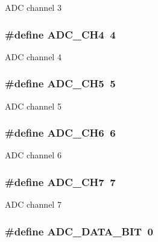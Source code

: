 A\-D\-C channel 3 \hypertarget{group__ex4__adc_ga3648bb19b5c3735452fee16c835afc43}{
\subsubsection[{A\-D\-C\-\_\-\-C\-H4}]{\setlength{\rightskip}{0pt plus 5cm}\#define A\-D\-C\-\_\-\-C\-H4~4}}\label{group__ex4__adc_ga3648bb19b5c3735452fee16c835afc43}
A\-D\-C channel 4 \hypertarget{group__ex4__adc_ga479d965dae60f80b698f0dd6a348e30a}{
\subsubsection[{A\-D\-C\-\_\-\-C\-H5}]{\setlength{\rightskip}{0pt plus 5cm}\#define A\-D\-C\-\_\-\-C\-H5~5}}\label{group__ex4__adc_ga479d965dae60f80b698f0dd6a348e30a}
A\-D\-C channel 5 \hypertarget{group__ex4__adc_gaec122320eeb7216887651ef5f1c73442}{
\subsubsection[{A\-D\-C\-\_\-\-C\-H6}]{\setlength{\rightskip}{0pt plus 5cm}\#define A\-D\-C\-\_\-\-C\-H6~6}}\label{group__ex4__adc_gaec122320eeb7216887651ef5f1c73442}
A\-D\-C channel 6 \hypertarget{group__ex4__adc_gaea897f597c4ee7b003920953fb213638}{
\subsubsection[{A\-D\-C\-\_\-\-C\-H7}]{\setlength{\rightskip}{0pt plus 5cm}\#define A\-D\-C\-\_\-\-C\-H7~7}}\label{group__ex4__adc_gaea897f597c4ee7b003920953fb213638}
A\-D\-C channel 7 \hypertarget{group__ex4__adc_ga166c1f0adb5ea80087faac7746224568}{
\subsubsection[{A\-D\-C\-\_\-\-D\-A\-T\-A\-\_\-10\-B\-I\-T}]{\setlength{\rightskip}{0pt plus 5cm}\#define A\-D\-C\-\_\-\-D\-A\-T\-A\-\_\-B\-I\-T~0}}\label{group__ex4__adc_ga166c1f0adb5ea80087faac7746224568}
